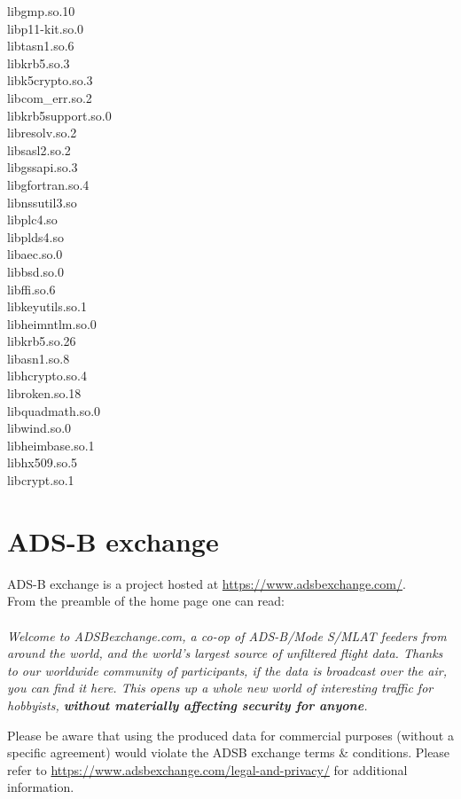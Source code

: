 \begin{multicols}{2}
libgmp.so.10 \\
libp11-kit.so.0 \\
libtasn1.so.6 \\
libkrb5.so.3 \\
libk5crypto.so.3 \\
libcom\_err.so.2 \\
libkrb5support.so.0 \\
libresolv.so.2 \\
libsasl2.so.2 \\
libgssapi.so.3 \\
libgfortran.so.4 \\
libnssutil3.so \\
libplc4.so \\
libplds4.so \\
libaec.so.0 \\
libbsd.so.0 \\
libffi.so.6 \\
libkeyutils.so.1 \\
libheimntlm.so.0 \\
libkrb5.so.26 \\
libasn1.so.8 \\
libhcrypto.so.4 \\
libroken.so.18 \\
libquadmath.so.0 \\
libwind.so.0 \\
libheimbase.so.1 \\
libhx509.so.5 \\
libcrypt.so.1
\end{multicols}

\section{ADS-B exchange}
\label{sec:adsbex}

ADS-B exchange is a project hosted at \url{https://www.adsbexchange.com/}. \\

From the preamble of the home page one can read: \\\\
\textit{Welcome to ADSBexchange.com, a co-op of ADS-B/Mode S/MLAT feeders from around the world, and the world's largest source of unfiltered flight data.  Thanks to our worldwide community of participants, if the data is broadcast over the air, you can find it here.  This opens up a whole new world of interesting traffic for hobbyists, \textbf{without materially affecting security for anyone}. \\}

Please be aware that using the produced data for commercial purposes (without a specific agreement) would violate the ADSB exchange terms \& conditions. Please refer to \url{https://www.adsbexchange.com/legal-and-privacy/} for additional information.\\

